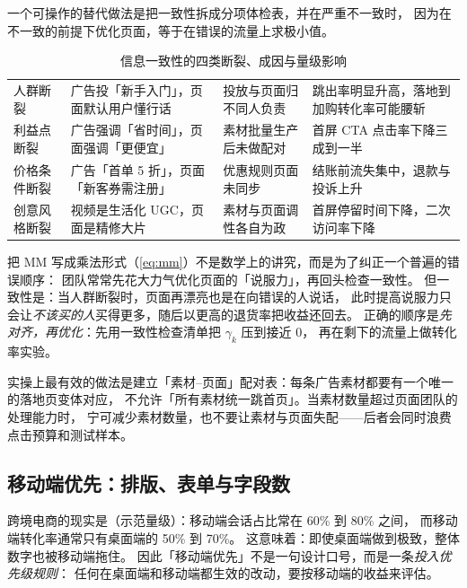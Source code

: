 一个可操作的替代做法是把一致性拆成分项体检表，并在严重不一致时，
因为在不一致的前提下优化页面，等于在错误的流量上求极小值。

\begin{table}[htbp]
\centering
\caption{信息一致性的四类断裂、成因与量级影响}
\label{tab:msgmatch}
\small
\begin{tabularx}{\textwidth}{L{2.0cm} L{3.6cm} L{3.2cm} Y}
\toprule
{} &  &  &  \\
\midrule
人群断裂 & 广告投「新手入门」，页面默认用户懂行话 & 投放与页面归不同人负责 & 跳出率明显升高，落地到加购转化率可能腰斩 \\
利益点断裂 & 广告强调「省时间」，页面强调「更便宜」 & 素材批量生产后未做配对 & 首屏 CTA 点击率下降三成到一半 \\
价格条件断裂 & 广告「首单 5 折」，页面「新客券需注册」 & 优惠规则页面未同步 & 结账前流失集中，退款与投诉上升 \\
创意风格断裂 & 视频是生活化 UGC，页面是精修大片 & 素材与页面调性各自为政 & 首屏停留时间下降，二次访问率下降 \\
\bottomrule
\end{tabularx}
\end{table}

\begin{insight}
把 $\mathrm{MM}$ 写成乘法形式（\cref{eq:mm}）不是数学上的讲究，而是为了纠正一个普遍的错误顺序：
团队常常先花大力气优化页面的「说服力」，再回头检查一致性。
但一致性是：当人群断裂时，页面再漂亮也是在向错误的人说话，
此时提高说服力只会让\emph{不该买的人}买得更多，随后以更高的退货率把收益还回去。
正确的顺序是\emph{先对齐，再优化}：先用一致性检查清单把 $\gamma_k$ 压到接近 0，
再在剩下的流量上做转化率实验。
\end{insight}

实操上最有效的做法是建立「素材--页面」配对表：每条广告素材都要有一个唯一的落地页变体对应，
不允许「所有素材统一跳首页」。当素材数量超过页面团队的处理能力时，
宁可减少素材数量，也不要让素材与页面失配——后者会同时浪费点击预算和测试样本。

\subsection{移动端优先：排版、表单与字段数}

跨境电商的现实是（示范量级）：移动端会话占比常在 60\% 到 80\% 之间，
而移动端转化率通常只有桌面端的 50\% 到 70\%。
这意味着：即使桌面端做到极致，整体数字也被移动端拖住。
因此「移动端优先」不是一句设计口号，而是一条\emph{投入优先级规则}：
任何在桌面端和移动端都生效的改动，要按移动端的收益来评估。

